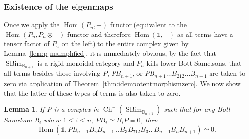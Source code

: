 \documentclass[11pt]{article}
\DeclareMathOperator{\Hom}{Hom}
\DeclareMathOperator{\Ch}{Ch}
\DeclareMathOperator{\SBim}{SBim}
\newtheorem{lemma}[thm]{Lemma}
\theoremstyle{definition}
\theoremstyle{remark}
\numberwithin{equation}{section}
\begin{document}
\subsubsection{Existence of the eigenmaps}
Once we apply the $\Hom(P_n,-)$ functor
(equivalent to the $\Hom(P_n,P_n\otimes -)$ functor and therefore
$\Hom(\mathbb{1},-)$
as all terms have a tensor factor of $P_n$ on the left)
to the entire complex given by
Lemma~\ref{lem:pjmsimplified}, it is immediately obvious, by the fact that
$\SBim_{\mathbb{B}_{n+1}}$ is a rigid monoidal category and $P_n$ kills lower Bott-Samelsons,
that all terms besides those involving $P$, $PB_{n+1}$, or 
$PB_{n+1}\dots B_{212}\dots B_{n+1}$ are taken to zero
via application
of Theorem~\ref{thm:idempotentmorphismzero}. We now show that the
latter of these types of terms is also taken to zero.
\begin{lemma}
	\label{lem:homspacezerolightleaves}
	If $P$ is a complex in $\Ch^-(\SBim_{\mathbb{B}_{n+1}})$ such that for
	any Bott-Samelson $B_i$ where $1 \leq i \leq n$, $PB_i\simeq
	B_iP=0$, then
	\[\Hom
		(\mathbb{1},PB_{n+1}B_nB_{n-1}\dots B_{3}B_{212}B_{3}\dots
	B_{n-1}B_nB_{n+1})\simeq 0.\]
\end{lemma}
\end{document}
